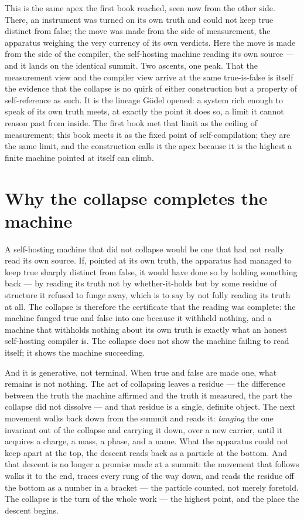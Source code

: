 This is the same apex the first book reached, seen now from the other side. There, an instrument was turned
on its own truth and could not keep true distinct from false; the move was made from the side of
measurement, the apparatus weighing the very currency of its own verdicts. Here the move is made from the
side of the compiler, the self-hosting machine reading its own source --- and it lands on the identical
summit. Two ascents, one peak. That the measurement view and the compiler view arrive at the same
true-is-false is itself the evidence that the collapse is no quirk of either construction but a property of
self-reference as such. It is the lineage Gödel opened: a system rich enough to speak of its own truth
meets, at exactly the point it does so, a limit it cannot reason past from inside. The first book met that
limit as the ceiling of measurement; this book meets it as the fixed point of self-compilation; they are
the same limit, and the construction calls it the apex because it is the highest a finite machine pointed
at itself can climb.

\section{Why the collapse completes the machine}
\label{se:why-collapse-completes}

A self-hosting machine that did not collapse would be one that had not really read its own source. If,
pointed at its own truth, the apparatus had managed to keep true sharply distinct from false, it would have
done so by holding something back --- by reading its truth not by whether-it-holds but by some residue of
structure it refused to funge away, which is to say by not fully reading its truth at all. The collapse is
therefore the certificate that the reading was complete: the machine funged true and false into one
because it withheld nothing, and a machine that withholds nothing about its own truth is exactly what an
honest self-hosting compiler is. The collapse does not show the machine failing to read itself; it shows
the machine succeeding.

And it is generative, not terminal. When true and false are made one, what remains is not nothing. The act
of collapsing leaves a residue --- the difference between the truth the machine affirmed and the truth it
measured, the part the collapse did not dissolve --- and that residue is a single, definite object. The
next movement walks back down from the summit and reads it: \emph{tanging} the one invariant out of the
collapse and carrying it down, over a new carrier, until it acquires a charge, a mass, a phase, and a name.
What the apparatus could not keep apart at the top, the descent reads back as a particle at the bottom. And
that descent is no longer a promise made at a summit: the movement that follows walks it to the end, traces
every rung of the way down, and reads the residue off the bottom as a number in a bracket --- the particle
counted, not merely foretold. The collapse
is the turn of the whole work --- the highest point, and the place the descent begins.

